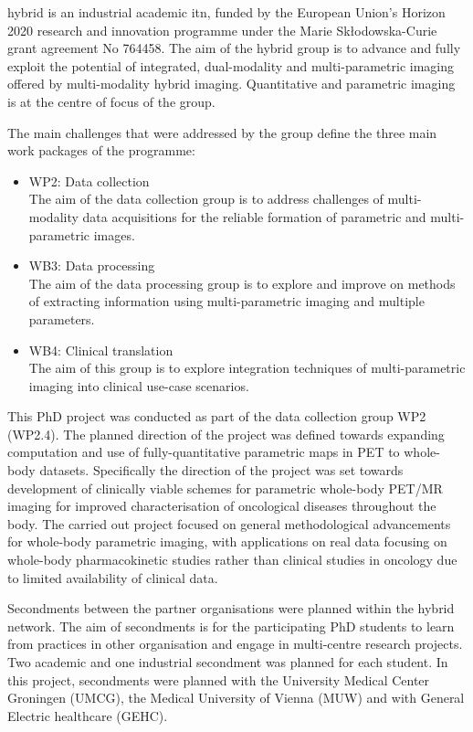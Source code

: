 \Gls{hybrid} is an industrial academic \gls{itn}, funded by the European Union's Horizon 2020 research and innovation programme under the Marie Sk\l{}odowska-Curie grant agreement No 764458.
The aim of the \gls{hybrid} group is to advance and fully exploit the potential of integrated, dual-modality and multi-parametric imaging offered by multi-modality hybrid imaging. Quantitative and parametric imaging is at the centre of focus of the group. 

The main challenges that were addressed by the group define the three main work packages of the programme:
\begin{itemize}
    \item WP2: Data collection \\
    The aim of the data collection group is to address challenges of multi-modality data acquisitions for the reliable formation of parametric and multi-parametric images. 
    \item WB3: Data processing \\
    The aim of the data processing group is to explore and improve on methods of extracting information using multi-parametric imaging and multiple parameters. 
    \item WB4: Clinical translation \\
    The aim of this group is to explore integration techniques of multi-parametric imaging into clinical use-case scenarios. 
\end{itemize}

This PhD project was conducted as part of the data collection group WP2 (WP2.4). The planned direction of the project was defined towards expanding computation and use of fully-quantitative parametric maps in PET to whole-body datasets. Specifically the direction of the project was set towards development of clinically viable schemes for parametric whole-body PET/MR imaging for improved characterisation of oncological diseases throughout the body. The carried out project focused on general methodological advancements for whole-body parametric imaging, with applications on real data focusing on whole-body pharmacokinetic studies rather than clinical studies in oncology due to limited availability of clinical data. 

Secondments between the partner organisations were planned within the \gls{hybrid} network. The aim of secondments is for the participating PhD students to learn from practices in other organisation and engage in multi-centre research projects. Two academic and one industrial secondment was planned for each student. 
In this project, secondments were planned with the University Medical Center Groningen (UMCG), the Medical University of Vienna (MUW) and with General Electric healthcare (GEHC).%

